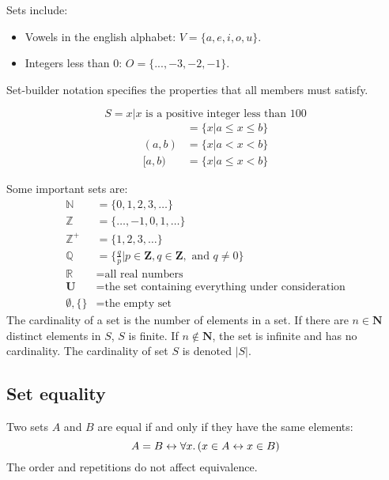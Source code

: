 \begin{example}
    Sets include:
    \begin{itemize}
        \item Vowels in the english alphabet: \(V = \{a, e, i, o, u\}\).
        \item Integers less than \(0\): \(O = \{..., -3, -2, -1\}\).
    \end{itemize}
\end{example}
Set-builder notation specifies the properties that all members must satisfy.
\begin{example}
    \begin{equation*}
        S = {x | x \text{ is a positive integer less than } 100}
    \end{equation*}
    \begin{align*}
        [a, b] & = \{x | a \leq x \leq b\} \\
        (a, b) & =\{x | a < x < b\}        \\
        [a, b) & =\{x | a \leq x < b\}
    \end{align*}
\end{example}
Some important sets are:
\begin{align*}
    \mathbb{N}      & = \{0, 1, 2, 3, \dots\}                                                       \\
    \mathbb{Z}      & = \{\dots, -1, 0, 1, \dots\}                                                  \\
    \mathbb{Z^+}    & = \{1, 2, 3, \dots\}                                                          \\
    \mathbb{Q}      & = \{\frac{q}{p} | p \in \mathbf{Z}, q \in \mathbf{Z}, \text{ and } q \ne 0 \} \\
    \mathbb{R}      & = \text{all real numbers}                                                     \\
    \mathbf{U}      & = \text{the set containing everything under consideration}                    \\
    \emptyset, \{\} & = \text{the empty set}
\end{align*}
The cardinality of a set is the number of elements in a set. If there are \(n \in \mathbf{N}\) distinct elements in \(S\), \(S\) is finite. If \(n \notin \mathbf{N}\), the set is infinite and has no cardinality. The cardinality of set \(S\) is denoted \(|S|\).

\subsection{Set equality}
Two sets \(A\) and \(B\) are equal if and only if they have the same elements:
\begin{equation}
    \label{eq:set_equivalence}
    A = B \leftrightarrow \forall x\ldotp (x \in A \leftrightarrow x \in B)
\end{equation}
The order and repetitions do not affect equivalence.

